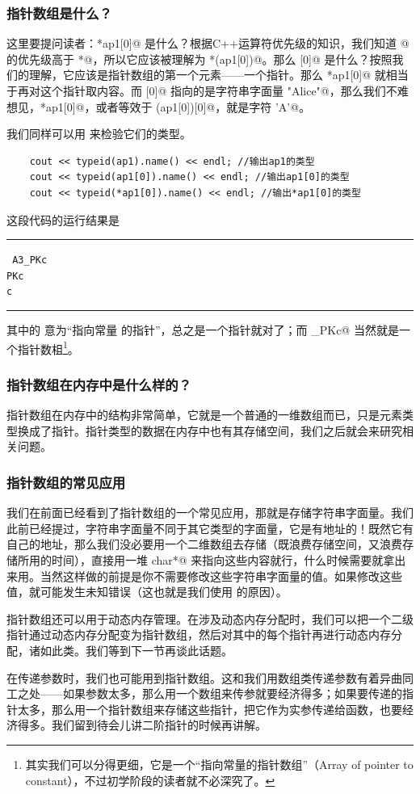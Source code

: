 \subsubsection*{指针数组是什么？}
这里要提问读者：\lstinline@*ap1[0]@ 是什么？根据C++运算符优先级的知识，我们知道 \lstinline@[]@ 的优先级高于 \lstinline@*@，所以它应该被理解为 \lstinline@*(ap1[0])@。那么 [0]@ 是什么？按照我们的理解，它应该是指针数组的第一个元素——一个指针。那么 \lstinline@*ap1[0]@ 就相当于再对这个指针取内容。而 [0]@ 指向的是字符串字面量 \lstinline@"Alice"@，那么我们不难想见，\lstinline@*ap1[0]@，或者等效于 \lstinline@(ap1[0])[0]@，就是字符 \lstinline@'A'@。\par
我们同样可以用 \lstinline@typeid@ 来检验它们的类型。
\begin{lstlisting}
    cout << typeid(ap1).name() << endl; //输出ap1的类型
    cout << typeid(ap1[0]).name() << endl; //输出ap1[0]的类型
    cout << typeid(*ap1[0]).name() << endl; //输出*ap1[0]的类型
\end{lstlisting}
这段代码的运行结果是\\\noindent\rule{\linewidth}{.2pt}\texttt{
A3\_PKc\\
PKc\\
c
}\\\noindent\rule{\linewidth}{.2pt}
其中的 \lstinline@PKc@ 意为``指向常量 \lstinline@char@ 的指针''，总之是一个指针就对了；而 _PKc@ 当然就是一个指针数柤\footnote{其实我们可以分得更细，它是一个``指向常量的指针数组''（Array of pointer to constant），不过初学阶段的读者就不必深究了。}。\par
\subsubsection*{指针数组在内存中是什么样的？}
指针数组在内存中的结构非常简单，它就是一个普通的一维数组而已，只是元素类型换成了指针。指针类型的数据在内存中也有其存储空间，我们之后就会来研究相关问题。\par
\subsubsection*{指针数组的常见应用}
我们在前面已经看到了指针数组的一个常见应用，那就是存储字符串字面量。我们此前已经提过，字符串字面量不同于其它类型的字面量，它是有地址的！既然它有自己的地址，那么我们没必要用一个二维数组去存储（既浪费存储空间，又浪费存储所用的时间），直接用一堆 \lstinline@const char*@ 来指向这些内容就行，什么时候需要就拿出来用。当然这样做的前提是你不需要修改这些字符串字面量的值。如果修改这些值，就可能发生未知错误（这也就是我们使用 \lstinline@const@ 的原因）。\par
指针数组还可以用于动态内存管理。在涉及动态内存分配时，我们可以把一个二级指针通过动态内存分配变为指针数组，然后对其中的每个指针再进行动态内存分配，诸如此类。我们等到下一节再谈此话题。\par
在传递参数时，我们也可能用到指针数组。这和我们用数组类传递参数有着异曲同工之处——如果参数太多，那么用一个数组来传参就要经济得多；如果要传递的指针太多，那么用一个指针数组来存储这些指针，把它作为实参传递给函数，也要经济得多。我们留到待会儿讲二阶指针的时候再讲解。\par

